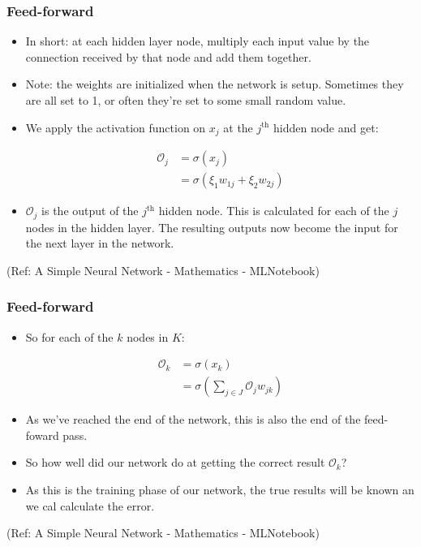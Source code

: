 \begin{frame}[fragile] \frametitle{Feed-forward}
\begin{itemize}
\item In short: at each hidden layer node, multiply each input value by the connection received by that node and add them together.

\item Note: the weights are initialized when the network is setup. Sometimes they are all set to 1, or often they’re set to some small random value.
\item We apply the activation function on $x_{j}$ at the $j^{\text{th}}$ hidden node and get:

\begin{align}
\mathcal{O}_{j} &= \sigma(x_{j}) \\
&= \sigma(  \xi_{1} w_{1j} + \xi_{2} w_{2j})
\end{align}

\item $\mathcal{O}_{j}$ is the output of the $j^{\text{th}}$ hidden node. 
This is calculated for each of the $j$ nodes in the hidden layer. 
The resulting outputs now become the input for the next layer in the network.
\end{itemize}

\tiny{(Ref: A Simple Neural Network - Mathematics - MLNotebook)}
\end{frame}


\begin{frame}[fragile] \frametitle{Feed-forward}
\begin{itemize}
\item So for each of the $k$ nodes in $K$:

\begin{align}
\mathcal{O}_{k} &= \sigma(x_{k}) \\
&= \sigma \left( \sum_{j \in J}  \mathcal{O}_{j} w_{jk}  \right)
\end{align}

\item As we’ve reached the end of the network, this is also the end of the feed-foward pass. 
\item So how well did our network do at getting the correct result $\mathcal{O}_{k}$? 
\item As this is the training phase of our network, the true results will be known an we cal calculate the error.
\end{itemize}

\tiny{(Ref: A Simple Neural Network - Mathematics - MLNotebook)}
\end{frame}

